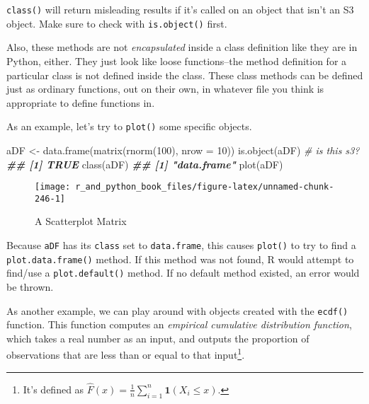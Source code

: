 \documentclass[
  12pt,
  krantz2]{krantz}
\makeatletter
\newenvironment{Shaded}{\begin{snugshade}}{\end{snugshade}}
\newcommand{\AttributeTok}[1]{\textcolor[rgb]{0.61,0.61,0.61}{#1}}
\newcommand{\CommentTok}[1]{\textcolor[rgb]{0.37,0.37,0.37}{\textit{#1}}}
\newcommand{\DecValTok}[1]{\textcolor[rgb]{0.06,0.06,0.06}{#1}}
\newcommand{\DocumentationTok}[1]{\textcolor[rgb]{0.37,0.37,0.37}{\textbf{\textit{#1}}}}
\newcommand{\FunctionTok}[1]{\textcolor[rgb]{0,0,0}{#1}}
\newcommand{\NormalTok}[1]{#1}
\newcommand{\OtherTok}[1]{\textcolor[rgb]{0.37,0.37,0.37}{#1}}
\newenvironment{kframe}{%
\medskip{}
\setlength{\fboxsep}{.8em}
 \def\at@end@of@kframe{}%
 \ifinner\ifhmode%
  \def\at@end@of@kframe{\end{minipage}}%
  \begin{minipage}{\columnwidth}%
 \fi\fi%
 \def\FrameCommand##1{\hskip\@totalleftmargin \hskip-\fboxsep
 \colorbox{shadecolor}{##1}\hskip-\fboxsep
     \hskip-\linewidth \hskip-\@totalleftmargin \hskip\columnwidth}%
 \MakeFramed {\advance\hsize-\width
   \@totalleftmargin\z@ \linewidth\hsize
   \@setminipage}}%
 {\par\unskip\endMakeFramed%
 \at@end@of@kframe}
\renewenvironment{Shaded}{\begin{kframe}}{\end{kframe}}
\makeatother
\begin{document}
\begin{rmd-caution}
\texttt{class()} will return misleading results if it's called on an object that isn't an S3 object. Make sure to check with \texttt{is.object()} first.

\end{rmd-caution}

Also, these methods are not \emph{encapsulated} inside a class definition like they are in Python, either. They just look like loose functions--the method definition for a particular class is not defined inside the class. These class methods can be defined just as ordinary functions, out on their own, in whatever file you think is appropriate to define functions in.

As an example, let's try to \texttt{plot()} some specific objects.

\begin{Shaded}
\begin{Highlighting}[]
\NormalTok{aDF }\OtherTok{\textless{}{-}} \FunctionTok{data.frame}\NormalTok{(}\FunctionTok{matrix}\NormalTok{(}\FunctionTok{rnorm}\NormalTok{(}\DecValTok{100}\NormalTok{), }\AttributeTok{nrow =} \DecValTok{10}\NormalTok{))}
\FunctionTok{is.object}\NormalTok{(aDF) }\CommentTok{\# is this s3?}
\DocumentationTok{\#\# [1] TRUE}
\FunctionTok{class}\NormalTok{(aDF)}
\DocumentationTok{\#\# [1] "data.frame"}
\FunctionTok{plot}\NormalTok{(aDF)}
\end{Highlighting}
\end{Shaded}

\begin{figure}

{\centering \texttt{[image: r\_and\_python\_book\_files/figure-latex/unnamed-chunk-246-1]} 

}

\caption{A Scatterplot Matrix}\label{fig:unnamed-chunk-246}
\end{figure}

Because \texttt{aDF} has its \texttt{class} set to \texttt{data.frame}, this causes \texttt{plot()} to try to find a \texttt{plot.data.frame()} method. If this method was not found, R would attempt to find/use a \texttt{plot.default()} method. If no default method existed, an error would be thrown.

As another example, we can play around with objects created with the \texttt{ecdf()} function. This function computes an \emph{empirical cumulative distribution function}, which takes a real number as an input, and outputs the proportion of observations that are less than or equal to that input\footnote{It's defined as \(\hat{F}(x) = \frac{1}{n}\sum_{i=1}^n \mathbf{1}(X_i \le x)\).}.
\end{document}
